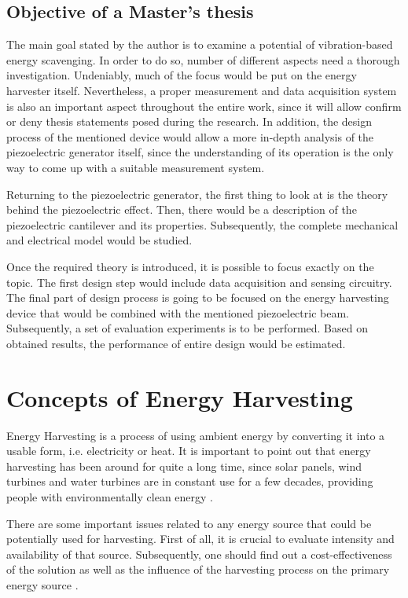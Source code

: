 \documentclass[12pt,a4paper]{article}
\begin{document}
\subsection{Objective of a Master's thesis}
The main goal stated by the author is to examine a potential of vibration-based energy scavenging. In order to do so, number of different aspects need a thorough investigation. Undeniably, much of the focus would be put on the energy harvester itself. Nevertheless, a proper measurement and data acquisition system is also an important aspect throughout the entire work, since it will allow confirm or deny thesis statements posed during the research. In addition, the design process of the mentioned device would allow a more in-depth analysis of the piezoelectric generator itself, since the understanding of its operation is the only way to come up with a suitable measurement system.
\par
Returning to the piezoelectric generator, the first thing to look at is the theory behind the piezoelectric effect. Then, there would be a description of the piezoelectric cantilever  and its properties. Subsequently, the complete mechanical and electrical model would be studied.
\par

Once the required theory is introduced, it is possible to focus exactly on the topic. The first design step would include data acquisition and sensing circuitry. The final part of design process is going to be focused on the energy harvesting device that would be combined with the mentioned piezoelectric beam. Subsequently, a set of evaluation experiments is to be performed. Based on obtained results, the performance of entire design would be estimated.

\clearpage


\FloatBarrier

\section{Concepts of Energy Harvesting}
Energy Harvesting is a process of using ambient energy by converting it into a usable form, i.e. electricity or heat. It is important to point out that energy harvesting has been around for quite a long time, since solar panels, wind turbines and water turbines are in constant use for a few decades, providing people with environmentally clean energy \cite{EnHv1}.
\par

There are some important issues related to any energy source that could be potentially used for harvesting. First of all, it is crucial to evaluate intensity and availability of that source. Subsequently, one should find out a cost-effectiveness of the solution as well as the influence of the harvesting process on the primary energy source \cite{EnHv1}.
\par
\end{document}
